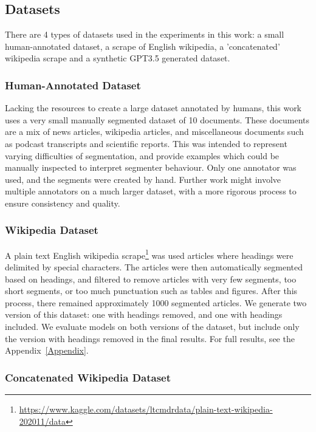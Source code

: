 \subsection{Datasets}

There are 4 types of datasets used in the experiments in this work: a small human-annotated dataset, a scrape of English wikipedia, a 'concatenated' wikipedia scrape and a synthetic GPT3.5 generated dataset.

\subsubsection{Human-Annotated Dataset}

Lacking the resources to create a large dataset annotated by humans, this work uses a very small manually segmented dataset of 10 documents. These documents are a mix of news articles, wikipedia articles, and miscellaneous documents such as podcast transcripts and scientific reports. This was intended to represent varying difficulties of segmentation, and provide examples which could be manually inspected to interpret segmenter behaviour. Only one annotator was used, and the segments were created by hand. Further work might involve multiple annotators on a much larger dataset, with a more rigorous process to ensure consistency and quality.

\subsubsection{Wikipedia Dataset}

A plain text English wikipedia scrape\footnote{\url{https://www.kaggle.com/datasets/ltcmdrdata/plain-text-wikipedia-202011/data}} was used articles where headings were delimited by special characters. The articles were then automatically segmented based on headings, and filtered to remove articles with very few segments, too short segments, or too much punctuation such as tables and figures. After this process, there remained approximately 1000 segmented articles. We generate two version of this dataset: one with headings removed, and one with headings included. We evaluate models on both versions of the dataset, but include only the version with headings removed in the final results. For full results, see the Appendix~\ref{Appendix}.

\subsubsection{Concatenated Wikipedia Dataset}

